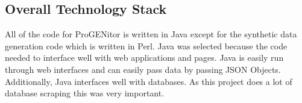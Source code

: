 \subsection{Overall Technology Stack}
All of the code for ProGENitor is written in Java except for the synthetic data
generation code which is written in Perl.  Java was selected because the code
needed to interface well with web applications and pages.  Java is easily run through
web interfaces and can easily pass data by passing JSON \cite{json} Objects. 
Additionally, Java interfaces well with databases.  As this project does a lot of database
scraping this was very important.

